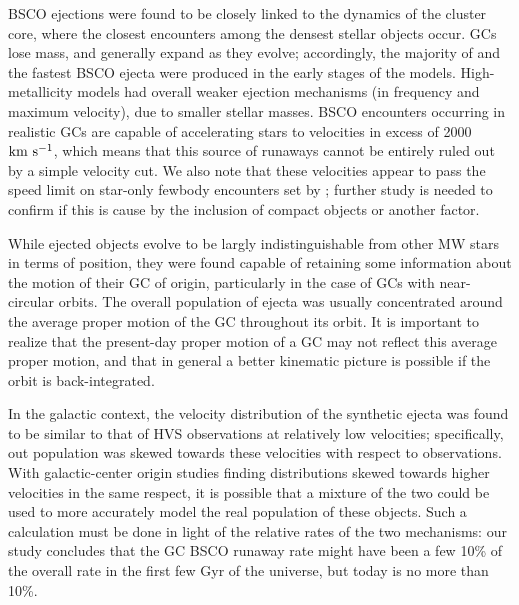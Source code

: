 \documentclass[twocolumn]{aastex631}
\newcommand{\kms}{${\rm km~s^{-1}}$}
\begin{document}
BSCO ejections were found to be closely linked to the dynamics of the cluster core, where the closest encounters among the densest stellar objects occur.
GCs lose mass, and generally expand as they evolve; accordingly, the majority of and the fastest BSCO ejecta were produced in the early stages of the models.
High-metallicity models had overall weaker ejection mechanisms (in frequency and maximum velocity), due to smaller stellar masses.
BSCO encounters occurring in realistic GCs are capable of accelerating stars to velocities in excess of 2000 \kms, which means that this source of runaways cannot be entirely ruled out by a simple velocity cut.
We also note that these velocities appear to pass the speed limit on star-only fewbody encounters set by \citet{1991AJ....101..562L}; further study is needed to confirm if this is cause by the inclusion of compact objects or another factor.

While ejected objects evolve to be largly indistinguishable from other MW stars in terms of position, they were found capable of retaining some information about the motion of their GC of origin, particularly in the case of GCs with near-circular orbits.
The overall population of ejecta was usually concentrated around the average proper motion of the GC throughout its orbit.
It is important to realize that the present-day proper motion of a GC may not reflect this average proper motion, and that in general a better kinematic picture is possible if the orbit is back-integrated.

In the galactic context, the velocity distribution of the synthetic ejecta was found to be similar to that of HVS observations at relatively low velocities; specifically, out population was skewed towards these velocities with respect to observations.
With galactic-center origin studies finding distributions skewed towards higher velocities in the same respect, it is possible that a mixture of the two could be used to more accurately model the real population of these objects.
Such a calculation must be done in light of the relative rates of the two mechanisms: our study concludes that the GC BSCO runaway rate might have been a few 10\% of the overall rate in the first few Gyr of the universe, but today is no more than 10\%.


\end{document}

